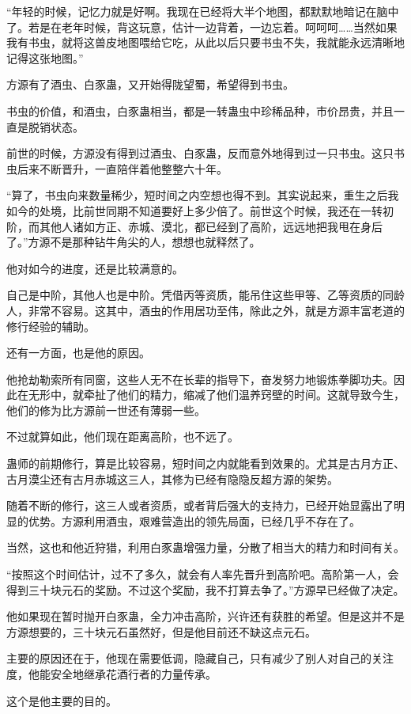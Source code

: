 \begin{this_body}
“年轻的时候，记忆力就是好啊。我现在已经将大半个地图，都默默地暗记在脑中了。若是在老年时候，背这玩意，估计一边背着，一边忘着。呵呵呵……当然如果我有书虫，就将这兽皮地图喂给它吃，从此以后只要书虫不失，我就能永远清晰地记得这张地图。”

方源有了酒虫、白豕蛊，又开始得陇望蜀，希望得到书虫。

书虫的价值，和酒虫，白豕蛊相当，都是一转蛊虫中珍稀品种，市价昂贵，并且一直是脱销状态。

前世的时候，方源没有得到过酒虫、白豕蛊，反而意外地得到过一只书虫。这只书虫后来不断晋升，一直陪伴着他整整六十年。

“算了，书虫向来数量稀少，短时间之内空想也得不到。其实说起来，重生之后我如今的处境，比前世同期不知道要好上多少倍了。前世这个时候，我还在一转初阶，而其他人诸如方正、赤城、漠北，都已经到了高阶，远远地把我甩在身后了。”方源不是那种钻牛角尖的人，想想也就释然了。

他对如今的进度，还是比较满意的。

自己是中阶，其他人也是中阶。凭借丙等资质，能吊住这些甲等、乙等资质的同龄人，非常不容易。这其中，酒虫的作用居功至伟，除此之外，就是方源丰富老道的修行经验的辅助。

还有一方面，也是他的原因。

他抢劫勒索所有同窗，这些人无不在长辈的指导下，奋发努力地锻炼拳脚功夫。因此在无形中，就牵扯了他们的精力，缩减了他们温养窍壁的时间。这就导致今生，他们的修为比方源前一世还有薄弱一些。

不过就算如此，他们现在距离高阶，也不远了。

蛊师的前期修行，算是比较容易，短时间之内就能看到效果的。尤其是古月方正、古月漠尘还有古月赤城这三人，其修为已经有隐隐反超方源的架势。

随着不断的修行，这三人或者资质，或者背后强大的支持力，已经开始显露出了明显的优势。方源利用酒虫，艰难营造出的领先局面，已经几乎不存在了。

当然，这也和他近狩猎，利用白豕蛊增强力量，分散了相当大的精力和时间有关。

“按照这个时间估计，过不了多久，就会有人率先晋升到高阶吧。高阶第一人，会得到三十块元石的奖励。不过这个奖励，我不打算去争了。”方源早已经做了决定。

他如果现在暂时抛开白豕蛊，全力冲击高阶，兴许还有获胜的希望。但是这并不是方源想要的，三十块元石虽然好，但是他目前还不缺这点元石。

主要的原因还在于，他现在需要低调，隐藏自己，只有减少了别人对自己的关注度，他能安全地继承花酒行者的力量传承。

这个是他主要的目的。


\end{this_body}
